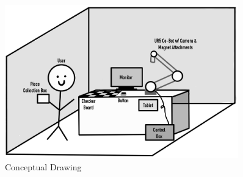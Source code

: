 \begin{figure}[h!]
	\centering
   	\includegraphics[width=0.90\textwidth]{images/Conceptual-Drawing.jpg}
    \caption{Conceptual Drawing}
\end{figure}
